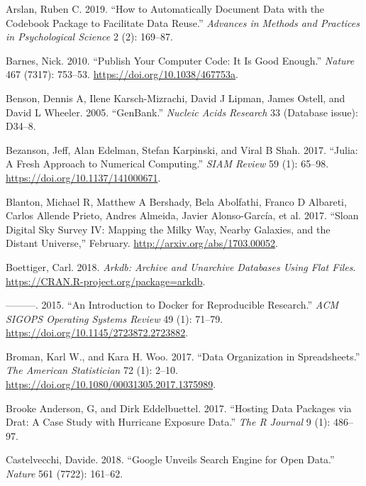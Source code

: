 \documentclass[
]{article}
\newlength{\cslhangindent}
\newenvironment{cslreferences}%
  {\setlength{\parindent}{0pt}%
  \everypar{\setlength{\hangindent}{\cslhangindent}}\ignorespaces}%
  {\par}
\begin{document}
\hypertarget{refs}{}
\begin{cslreferences}
\leavevmode\hypertarget{ref-Arslan2019}{}%
Arslan, Ruben C. 2019. ``How to Automatically Document Data with the Codebook Package to Facilitate Data Reuse.'' \emph{Advances in Methods and Practices in Psychological Science} 2 (2): 169--87.

\leavevmode\hypertarget{ref-Barnes2010}{}%
Barnes, Nick. 2010. ``Publish Your Computer Code: It Is Good Enough.'' \emph{Nature} 467 (7317): 753--53. \url{https://doi.org/10.1038/467753a}.

\leavevmode\hypertarget{ref-GenBank}{}%
Benson, Dennis A, Ilene Karsch-Mizrachi, David J Lipman, James Ostell, and David L Wheeler. 2005. ``GenBank.'' \emph{Nucleic Acids Research} 33 (Database issue): D34--8.

\leavevmode\hypertarget{ref-julia}{}%
Bezanson, Jeff, Alan Edelman, Stefan Karpinski, and Viral B Shah. 2017. ``Julia: A Fresh Approach to Numerical Computing.'' \emph{SIAM Review} 59 (1): 65--98. \url{https://doi.org/10.1137/141000671}.

\leavevmode\hypertarget{ref-sdss-four-paper}{}%
Blanton, Michael R, Matthew A Bershady, Bela Abolfathi, Franco D Albareti, Carlos Allende Prieto, Andres Almeida, Javier Alonso-García, et al. 2017. ``Sloan Digital Sky Survey IV: Mapping the Milky Way, Nearby Galaxies, and the Distant Universe,'' February. \url{http://arxiv.org/abs/1703.00052}.

\leavevmode\hypertarget{ref-arkdb}{}%
Boettiger, Carl. 2018. \emph{Arkdb: Archive and Unarchive Databases Using Flat Files}. \url{https://CRAN.R-project.org/package=arkdb}.

\leavevmode\hypertarget{ref-Boettiger2015}{}%
---------. 2015. ``An Introduction to Docker for Reproducible Research.'' \emph{ACM SIGOPS Operating Systems Review} 49 (1): 71--79. \url{https://doi.org/10.1145/2723872.2723882}.

\leavevmode\hypertarget{ref-Broman2017}{}%
Broman, Karl W., and Kara H. Woo. 2017. ``Data Organization in Spreadsheets.'' \emph{The American Statistician} 72 (1): 2--10. \url{https://doi.org/10.1080/00031305.2017.1375989}.

\leavevmode\hypertarget{ref-Brooke_Anderson2017}{}%
Brooke Anderson, G, and Dirk Eddelbuettel. 2017. ``Hosting Data Packages via Drat: A Case Study with Hurricane Exposure Data.'' \emph{The R Journal} 9 (1): 486--97.

\leavevmode\hypertarget{ref-google-data-search}{}%
Castelvecchi, Davide. 2018. ``Google Unveils Search Engine for Open Data.'' \emph{Nature} 561 (7722): 161--62.


\end{cslreferences}
\end{document}
